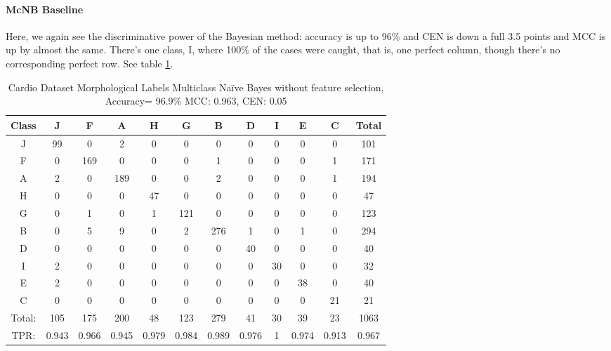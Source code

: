 \paragraph{McNB Baseline}
Here, we again see the discriminative power of the Bayesian method: accuracy is up to 96\% and CEN is down a full 3.5 points and MCC is up by almost the same.  There's one class, I, where 100\% of the cases were caught, that is, one perfect column, though there's no corresponding perfect row.  See table \ref{tab:cardiomorphmcnbbase}.
\begin{table}[h!]
	\centering
	\begin{tabular}{|c|c|c|c|c|c|c|c|c|c|c|c|}
\hline
Class&J&F&A&H&G&B&D&I&E&C&Total\\
\hline
J&99&0&2&0&0&0&0&0&0&0&101\\
F&0&169&0&0&0&1&0&0&0&1&171\\
A&2&0&189&0&0&2&0&0&0&1&194\\
H&0&0&0&47&0&0&0&0&0&0&47\\
G&0&1&0&1&121&0&0&0&0&0&123\\
B&0&5&9&0&2&276&1&0&1&0&294\\
D&0&0&0&0&0&0&40&0&0&0&40\\
I&2&0&0&0&0&0&0&30&0&0&32\\
E&2&0&0&0&0&0&0&0&38&0&40\\
C&0&0&0&0&0&0&0&0&0&21&21\\\hline
Total:&105&175&200&48&123&279&41&30&39&23&1063\\
TPR:&0.943&0.966&0.945&0.979&0.984&0.989&0.976&1&0.974&0.913&0.967\\
\hline
	\end{tabular}
	\caption[Cardiotocography Morphology:  Na\"ive Bayes without Feature Selection Confusion Matrix]{Cardio Dataset Morphological Labels Multiclass Na\"ive Bayes without feature selection, Accuracy= 96.9\% MCC: 0.963, CEN: 0.05}
	\label{tab:cardiomorphmcnbbase}
\end{table}
